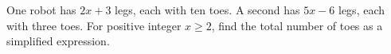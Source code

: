 One robot has $2x+3$ legs, each with ten toes. A second has $5x-6$ legs, each with three toes. For positive integer $x\ge2$, find the total number of toes as a simplified expression.

